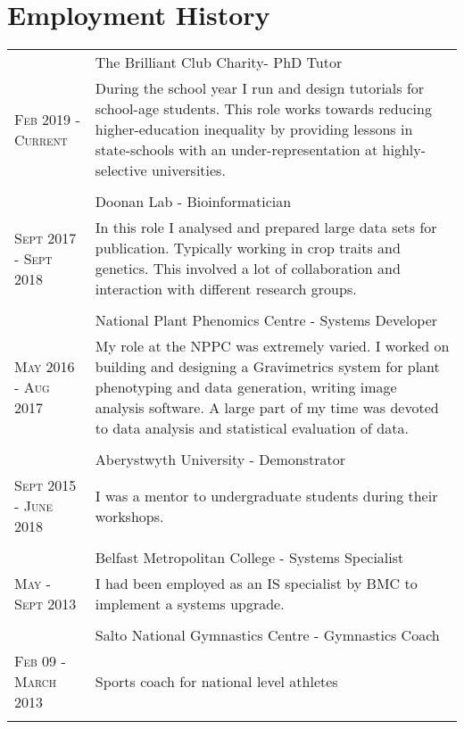 \documentclass[a4paper,10pt]{article}
\begin{document}
\section{Employment History}
  \begin{longtable}{l|p{9cm}}

    &The Brilliant Club Charity- PhD Tutor \\\textsc{Feb 2019 - Current}
    &\footnotesize{During the school year I run and design tutorials for
      school-age students. This role works towards reducing higher-education
      inequality by providing lessons in state-schools with an
      under-representation at highly-selective universities.}\\\multicolumn{2}{c}{} \\
    

    &Doonan Lab - Bioinformatician \\\textsc{Sept 2017 - Sept 2018}
    &\footnotesize{In this role I analysed and prepared large data sets for publication. Typically working in crop traits and genetics. This involved a lot of collaboration and interaction with different research groups.}\\\multicolumn{2}{c}{} \\

    &National Plant Phenomics Centre -  Systems Developer \\\textsc{May 2016 - Aug 2017}
    &\footnotesize{My role at the NPPC was extremely varied. I worked on building and designing a Gravimetrics system for plant phenotyping and data generation, writing image analysis software. A large part of my time was devoted to data analysis and statistical evaluation of data.}\\\multicolumn{2}{c}{} \\

    &Aberystwyth University -  Demonstrator \\ \textsc{Sept 2015 - June 2018}
    &\footnotesize{I was a mentor to undergraduate students during their workshops.}\\\multicolumn{2}{c}{} \\

    &Belfast Metropolitan College - Systems Specialist \\\textsc{May - Sept 2013}
    &\footnotesize{I had been employed as an IS specialist by BMC to implement a systems upgrade.}\\\multicolumn{2}{c}{} \\

    &Salto National Gymnastics Centre - Gymnastics Coach \\\textsc{Feb 09 - March 2013}
     & \footnotesize{Sports coach for national level athletes}\\\multicolumn{2}{c}{} \\
  \end{longtable}
\end{document}
